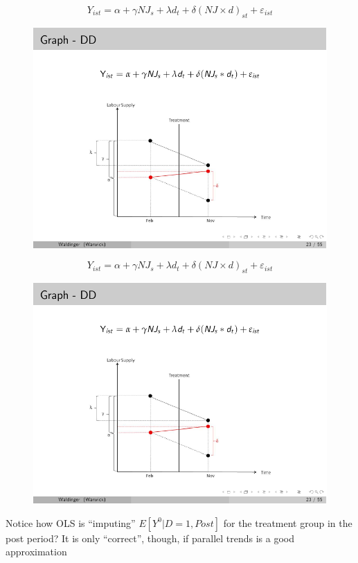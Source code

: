 \documentclass{beamer}
\begin{document}
\begin{frame}[plain]
	$$Y_{ist} = \alpha + \gamma NJ_s + \lambda d_t + \delta(NJ\times d)_{st} + \varepsilon_{ist}$$
	\begin{figure}
	\includegraphics[scale=0.90]{./lecture_includes/waldinger_dd_5.pdf}
	\end{figure}
\end{frame}


\begin{frame}[plain]
	$$Y_{ist} = \alpha + \gamma NJ_s + \lambda d_t + \delta(NJ\times d)_{st} + \varepsilon_{ist}$$
	\begin{figure}
	\includegraphics[scale=0.90]{./lecture_includes/waldinger_dd_5.pdf}
	\end{figure}

Notice how OLS is ``imputing'' $E[Y^0|D=1,Post]$ for the treatment group in the post period? It is only ``correct'', though, if parallel trends is a good approximation

\end{frame}
\end{document}
